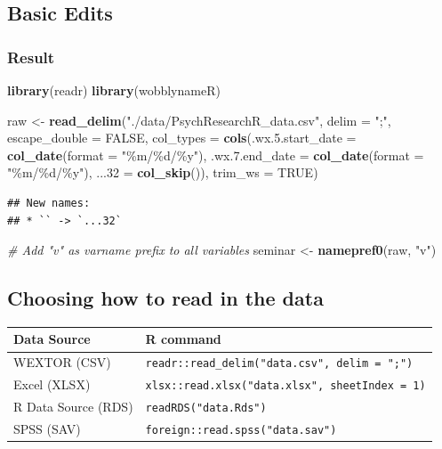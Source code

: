 \documentclass[
]{book}
\newenvironment{Shaded}{\begin{snugshade}}{\end{snugshade}}
\newcommand{\AttributeTok}[1]{\textcolor[rgb]{0.13,0.29,0.53}{#1}}
\newcommand{\CommentTok}[1]{\textcolor[rgb]{0.56,0.35,0.01}{\textit{#1}}}
\newcommand{\ConstantTok}[1]{\textcolor[rgb]{0.56,0.35,0.01}{#1}}
\newcommand{\FunctionTok}[1]{\textcolor[rgb]{0.13,0.29,0.53}{\textbf{#1}}}
\newcommand{\NormalTok}[1]{#1}
\newcommand{\OtherTok}[1]{\textcolor[rgb]{0.56,0.35,0.01}{#1}}
\newcommand{\StringTok}[1]{\textcolor[rgb]{0.31,0.60,0.02}{#1}}
\begin{document}
\subsection{\texorpdfstring{Basic Edits }{Basic Edits }}\label{basic-edits-1}

\subsubsection{Result}\label{result}

\begin{Shaded}
\begin{Highlighting}[]
\FunctionTok{library}\NormalTok{(readr)}
\FunctionTok{library}\NormalTok{(wobblynameR)}

\NormalTok{raw }\OtherTok{\textless{}{-}} \FunctionTok{read\_delim}\NormalTok{(}\StringTok{"./data/PsychResearchR\_data.csv"}\NormalTok{, }
    \AttributeTok{delim =} \StringTok{";"}\NormalTok{, }\AttributeTok{escape\_double =} \ConstantTok{FALSE}\NormalTok{, }
    \AttributeTok{col\_types =} \FunctionTok{cols}\NormalTok{(}\AttributeTok{.wx.5.start\_date =} \FunctionTok{col\_date}\NormalTok{(}\AttributeTok{format =} \StringTok{"\%m/\%d/\%y"}\NormalTok{),}
                     \AttributeTok{.wx.7.end\_date =} \FunctionTok{col\_date}\NormalTok{(}\AttributeTok{format =} \StringTok{"\%m/\%d/\%y"}\NormalTok{), }
                     \AttributeTok{...32 =} \FunctionTok{col\_skip}\NormalTok{()),}
    \AttributeTok{trim\_ws =} \ConstantTok{TRUE}\NormalTok{)}
\end{Highlighting}
\end{Shaded}

\begin{verbatim}
## New names:
## * `` -> `...32`
\end{verbatim}

\begin{Shaded}
\begin{Highlighting}[]
\CommentTok{\# Add "v" as varname prefix to all variables}
\NormalTok{seminar }\OtherTok{\textless{}{-}} \FunctionTok{namepref0}\NormalTok{(raw, }\StringTok{"v"}\NormalTok{)}
\end{Highlighting}
\end{Shaded}

\subsection{Choosing how to read in the data}\label{choosing-how-to-read-in-the-data}

\begin{longtable}[]{@{}ll@{}}
\toprule\noalign{}
Data Source & R command \\
\midrule\noalign{}
\endhead
\bottomrule\noalign{}
\endlastfoot
WEXTOR (CSV) & \texttt{readr::read\_delim("data.csv",\ delim\ =\ ";")} \\
Excel (XLSX) & \texttt{xlsx::read.xlsx("data.xlsx",\ sheetIndex\ =\ 1)} \\
R Data Source (RDS) & \texttt{readRDS("data.Rds")} \\
SPSS (SAV) & \texttt{foreign::read.spss("data.sav")} \\
\end{longtable}
\end{document}
